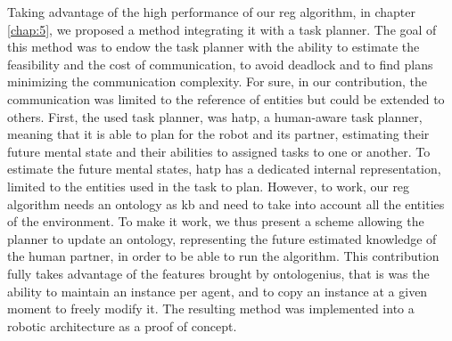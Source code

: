 Taking advantage of the high performance of our \acrshort{reg} algorithm, in chapter \ref{chap:5}, we proposed a method integrating it with a task planner. The goal of this method was to endow the task planner with the ability to estimate the feasibility and the cost of communication, to avoid deadlock and to find plans minimizing the communication complexity. For sure, in our contribution, the communication was limited to the reference of entities but could be extended to others. First, the used task planner, was \acrshort{hatp}, a human-aware task planner, meaning that it is able to plan for the robot and its partner, estimating their future mental state and their abilities to assigned tasks to one or another. To estimate the future mental states, \acrshort{hatp} has a dedicated internal representation, limited to the entities used in the task to plan. However, to work, our \acrshort{reg} algorithm needs an ontology as \acrshort{kb} and need to take into account all the entities of the environment. To make it work, we thus present a scheme allowing the planner to update an ontology, representing the future estimated knowledge of the human partner, in order to be able to run the algorithm. This contribution fully takes advantage of the features brought by ontologenius, that is was the ability to maintain an instance per agent, and to copy an instance at a given moment to freely modify it. The resulting method was implemented into a robotic architecture as a proof of concept.
